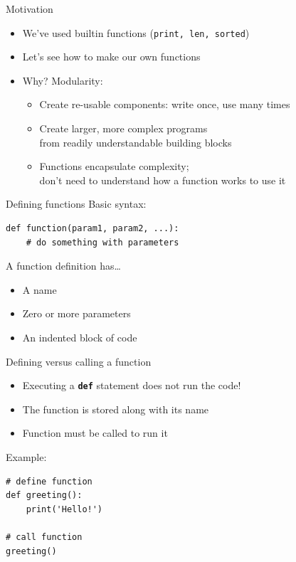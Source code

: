 \documentclass[aspectratio=169,usenames,dvipsnames]{beamer}
\begin{document}
\begin{frame}{Motivation}
    \begin{itemize}
        \item We've used builtin functions (\texttt{print, len, sorted})
        \item Let's see how to make our own functions
        \item Why? Modularity:
            \pause
            \begin{itemize}
                \item Create re-usable components:
                    write once, use many times
                \item Create larger, more complex programs \\
                    from readily understandable building blocks
                \item Functions encapsulate complexity; \\
                    don't need to understand how a function works to use it
            \end{itemize}
    \end{itemize}
\end{frame}

\begin{frame}[fragile]{Defining functions}
Basic syntax:
\begin{lstlisting}
def function(param1, param2, ...):
    # do something with parameters
\end{lstlisting}

    A function definition has\dots
    \begin{itemize}
        \item A name
        \item Zero or more parameters
        \item An indented block of code
    \end{itemize}
\end{frame}

\begin{frame}[fragile]{Defining versus calling a function}
    \begin{itemize}
        \item Executing a \texttt{\textbf{\textcolor{OliveGreen}{def}}}
            statement does not run the code!
        \item The function is stored along with its name
        \item Function must be called to run it
    \end{itemize}
    Example:
\begin{lstlisting}
# define function
def greeting():
    print('Hello!')

# call function
greeting()
\end{lstlisting}
\end{frame}
\end{document}
